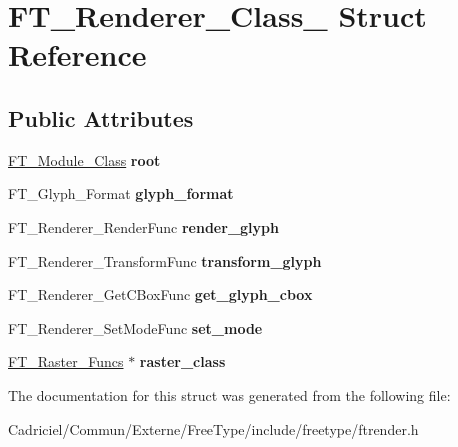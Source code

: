 \hypertarget{struct_f_t___renderer___class__}{\section{F\-T\-\_\-\-Renderer\-\_\-\-Class\-\_\- Struct Reference}
\label{struct_f_t___renderer___class__}
}
\subsection*{Public Attributes}
\begin{DoxyCompactItemize}
\item 
\hypertarget{struct_f_t___renderer___class___a3df4509f1de704596bf4237d6ff8cbd4}{\hyperlink{struct_f_t___module___class__}{F\-T\-\_\-\-Module\-\_\-\-Class} {\bfseries root}}\label{struct_f_t___renderer___class___a3df4509f1de704596bf4237d6ff8cbd4}

\item 
\hypertarget{struct_f_t___renderer___class___a2c8602452fae27379a6f85bbcb4b525c}{F\-T\-\_\-\-Glyph\-\_\-\-Format {\bfseries glyph\-\_\-format}}\label{struct_f_t___renderer___class___a2c8602452fae27379a6f85bbcb4b525c}

\item 
\hypertarget{struct_f_t___renderer___class___a7a022b8358ce3a06620c62f3542d0d2b}{F\-T\-\_\-\-Renderer\-\_\-\-Render\-Func {\bfseries render\-\_\-glyph}}\label{struct_f_t___renderer___class___a7a022b8358ce3a06620c62f3542d0d2b}

\item 
\hypertarget{struct_f_t___renderer___class___a2aef09ecdabacf5628ef29fb3d179def}{F\-T\-\_\-\-Renderer\-\_\-\-Transform\-Func {\bfseries transform\-\_\-glyph}}\label{struct_f_t___renderer___class___a2aef09ecdabacf5628ef29fb3d179def}

\item 
\hypertarget{struct_f_t___renderer___class___a4f9dc9b6d86504a8d3b04b4e72936e76}{F\-T\-\_\-\-Renderer\-\_\-\-Get\-C\-Box\-Func {\bfseries get\-\_\-glyph\-\_\-cbox}}\label{struct_f_t___renderer___class___a4f9dc9b6d86504a8d3b04b4e72936e76}

\item 
\hypertarget{struct_f_t___renderer___class___a7cfd4795107157aad4f7efcab77a0f64}{F\-T\-\_\-\-Renderer\-\_\-\-Set\-Mode\-Func {\bfseries set\-\_\-mode}}\label{struct_f_t___renderer___class___a7cfd4795107157aad4f7efcab77a0f64}

\item 
\hypertarget{struct_f_t___renderer___class___a5af75b9f582f98f9f74dbcbc530c7e88}{\hyperlink{struct_f_t___raster___funcs__}{F\-T\-\_\-\-Raster\-\_\-\-Funcs} $\ast$ {\bfseries raster\-\_\-class}}\label{struct_f_t___renderer___class___a5af75b9f582f98f9f74dbcbc530c7e88}

\end{DoxyCompactItemize}


The documentation for this struct was generated from the following file\-:\begin{DoxyCompactItemize}
\item 
Cadriciel/\-Commun/\-Externe/\-Free\-Type/include/freetype/ftrender.\-h\end{DoxyCompactItemize}
